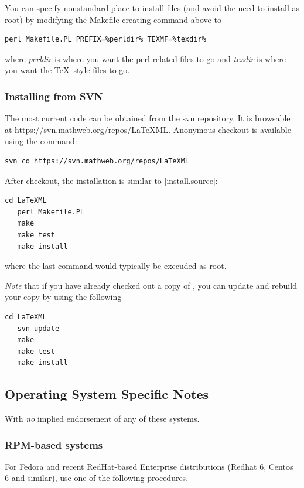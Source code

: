 \documentclass{article}
\begin{document}
You can specify nonstandard place to install files (and avoid the need to install as root)
by modifying the Makefile creating command above to
\begin{lstlisting}[style=shell]
   perl Makefile.PL PREFIX=%perldir% TEXMF=%texdir%
\end{lstlisting}
where \emph{perldir} is where you want the perl related files to go and
\emph{texdir} is where you want the \TeX\ style files to go.

\subsubsection{Installing from SVN}\label{install.svn}
The most current code can be obtained from the svn repository.
It is browsable at \url{https://svn.mathweb.org/repos/LaTeXML}.
Anonymous checkout is available using the command:
\begin{lstlisting}[style=shell]
  svn co https://svn.mathweb.org/repos/LaTeXML
\end{lstlisting}
After checkout, the installation is similar to \ref{install.source}:
\begin{lstlisting}[style=shell]
   cd LaTeXML
   perl Makefile.PL
   make
   make test
   make install
\end{lstlisting}
where the last command would typically be execuded as root.

\emph{Note} that if you have already checked out a copy of \LaTeXML, you can update
and rebuild your copy by using the following
\begin{lstlisting}[style=shell]
   cd LaTeXML
   svn update
   make
   make test
   make install
\end{lstlisting}

\subsection[OS-Specific Notes]{Operating System Specific Notes}\label{install.osnotes}
With \emph{no} implied endorsement of any of these systems.

\subsubsection[RPM-based systems]{RPM-based systems}\label{install.fedora}
For Fedora and recent RedHat-based Enterprise distributions
(Redhat 6, Centos 6 and similar), use one of the following procedures.
\end{document}
